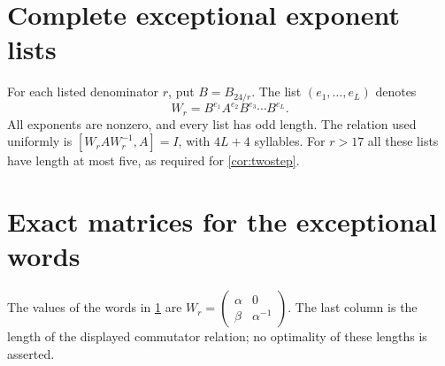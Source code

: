 \documentclass[11pt]{article}
\theoremstyle{definition}
\theoremstyle{remark}
\numberwithin{equation}{section}
\begin{document}
\clearpage
\section{Complete exceptional exponent lists}\label{app:words}
For each listed denominator $r$, put $B=B_{24/r}$. The list
$(e_1,\ldots,e_L)$ denotes
\[
 W_r=B^{e_1}A^{e_2}B^{e_3}\cdots B^{e_L}.
\]
All exponents are nonzero, and every list has odd length. The
relation used uniformly is $[W_rAW_r^{-1},A]=I$, with $4L+4$
syllables. For $r>17$ all these lists have length at most five,
as required for \cref{cor:twostep}.


\clearpage
\section{Exact matrices for the exceptional words}\label{app:matrices}
The values of the words in \cref{app:words} are
$W_r=\left(\begin{smallmatrix}\alpha&0\\\beta&\alpha^{-1}\end{smallmatrix}\right)$.
The last column is the length of the displayed commutator relation;
no optimality of these lengths is asserted.




\end{document}
